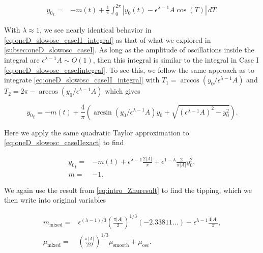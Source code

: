 \begin{equation}\label{eq:oneD_slowosc_caseII_integral}
\begin{aligned}
{y_0}_t=& -m(t)+\frac{1}{\pi}\int_0^{2\pi}|y_0(t)-\epsilon^{\lambda-1}A\cos(T)|\,dT.
\end{aligned}
\end{equation}

\indent With $\lambda\approx1$, we see nearly identical behavior in \eqref{eq:oneD_slowosc_caseII_integral} as that of what we explored in \autoref{subsec:oneD_slowosc_caseI}. As long as the amplitude of oscillations inside the integral are $\epsilon^{\lambda-1}A\sim O(1)$, then this integral is similar to the integral in Case I \eqref{eq:oneD_slowosc_caseIintegral}. To see this, we follow the same approach as to integrate \eqref{eq:oneD_slowosc_caseII_integral} with $T_1=\arccos(y_0/\epsilon^{\lambda-1}A)$ and $T_2=2\pi- \arccos(y_0/\epsilon^{\lambda-1}A)$ which gives

\begin{equation}\label{eq:oneD_slowosc_caseIIexact}
{y_0}_t=-m(t)+\frac{4}{\pi}\left(\arcsin(y_0/\epsilon^{\lambda-1}A)y_0+\sqrt{(\epsilon^{\lambda-1}A)^2-y_0^2}\right).
\end{equation}

Here we apply the same quadratic Taylor approximation to \eqref{eq:oneD_slowosc_caseIIexact} to find

\begin{equation}\label{eq:oneD_slowosc_caseII_taylor}
\begin{aligned}
{y_0}_t=&-m(t)+\epsilon^{\lambda-1}\frac{2|A|}{\pi}+\epsilon^{1-\lambda}\frac{2}{\pi |A|}y_0^2,\\
m=&-1.
\end{aligned}
\end{equation}

We again use the result from \eqref{eq:intro_Zhuresult} to find the tipping, which we then write into original variables

\begin{equation*}
\begin{aligned}
m_{\text{mixed}}=&\epsilon^{(\lambda-1)/3}\left(\frac{\pi |A|}{2}\right)^{1/3}(-2.33811\ldots)+\epsilon^{\lambda-1}\frac{4|A|}{\pi},\\
\mu_{\text{mixed}}=&\left(\frac{\pi |A|}{2\Omega}\right)^{1/3} \mu_{\text{smooth}}+\mu_{\text{osc}}.
\end{aligned}
\end{equation*}

